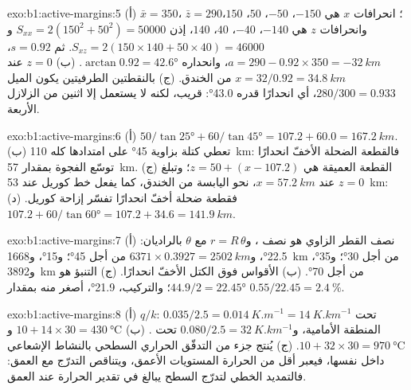 \begin{solution}{exo:b1:active-margins:5}
(أ) $\bar x = 350$، $\bar z = 290$؛ انحرافات $x$ هي $-150$، $-50$،
$50$، $150$، وانحرافات $z$ هي $-140$، $-40$، $40$، $140$، إذن
$S_{xx} = 2(150^2 + 50^2) = \num{50000}$ و
$S_{xz} = 2(150\times140 + 50\times40) = \num{46000}$. ثم $s = 0.92$،
$a = 290 - 0.92\times350 = \qty{-32}{km}$، وانحداره
$\arctan 0.92 = \ang{42.6}$. (ب) $z = 0$ عند $x = 32/0.92 = \qty{34.8}{km}$ من الخندق. (ج) بالنقطتين الطرفيتين يكون الميل $280/300 = 0.933$، أي انحدارًا قدره \ang{43.0}: قريب، لكنه لا يستعمل إلا اثنين من الزلازل الأربعة.
\end{solution}

\begin{solution}{exo:b1:active-margins:6}
(أ) $50/\tan\ang{25} + 60/\tan\ang{45} = 107.2 + 60.0 = \qty{167.2}{km}$. (ب) تعطي كتلة بزاوية \ang{45} على امتدادها كله \qty{110}{km}: فالقطعة الضحلة الأخفّ انحدارًا توسّع الفجوة بمقدار \qty{57}{km}. (ج) القطعة العميقة هي $z = 50 + (x - 107.2)$؛ وتبلغ $z = 0$ عند $x = \qty{57.2}{km}$، نحو اليابسة من الخندق، كما يفعل خط كوريل عند \qty{53}{km}: فقطعة ضحلة أخفّ انحدارًا تفسّر إزاحة كوريل. (د) $107.2 + 60/\tan\ang{60} = 107.2 + 34.6 =
\qty{141.9}{km}$.
\end{solution}

\begin{solution}{exo:b1:active-margins:7}
(أ) نصف القطر الزاوي هو نصف ، و$r = R\,\theta$ مع $\theta$ بالراديان: \ang{22.5}، و$6371\times0.3927 = \qty{2502}{km}$ من أجل \ang{45}؛ و\ang{15}، و\qty{1668}{km} من أجل \ang{30}؛ و\ang{35}، و\qty{3892}{km} من أجل \ang{70}. (ب) الأقواس فوق الكتل الأخفّ انحدارًا. (ج) التنبؤ هو $44.9/2 = \ang{22.45}$؛ والتركيب، \ang{21.9}، أصغر منه بمقدار $0.55/22.45 = \qty{2.4}{\percent}$.
\end{solution}

\begin{solution}{exo:b1:active-margins:8}
(أ) $q/k$: $0.035/2.5 = \qty{0.014}{K.m^{-1}} = \qty{14}{K.km^{-1}}$ تحت المنطقة الأمامية، و$0.080/2.5 = \qty{32}{K.km^{-1}}$ تحت . (ب) $10 + 14\times30 = \qty{430}{\celsius}$ و$10 + 32\times30 = \qty{970}{\celsius}$. (ج) يُنتج جزء من التدفّق الحراري السطحي بالنشاط الإشعاعي داخل  نفسها، فيعبر أقل من الحرارة المستويات الأعمق، ويتناقص التدرّج مع العمق: فالتمديد الخطي لتدرّج السطح يبالغ في تقدير الحرارة عند العمق.
\end{solution}

